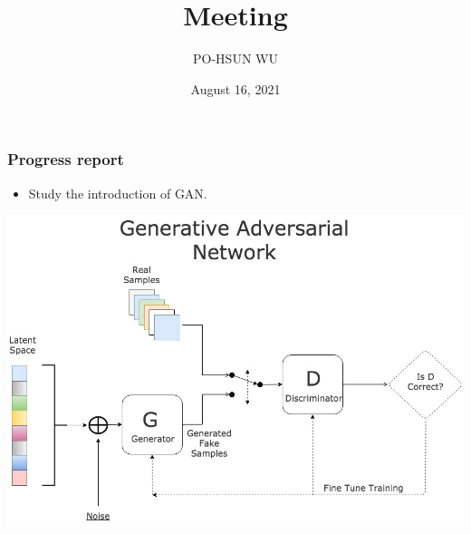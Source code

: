 \documentclass{beamer}
\date{August 16, 2021}
\title{Meeting}
\author{PO-HSUN WU}
\begin{document}
    \frame{\titlepage}

    \begin{frame}
        \frametitle{Progress report}
        \begin{itemize}
            \item Study the introduction of GAN.
        \end{itemize}
        \centering
        \includegraphics[scale=0.25]{GAN.jpeg}
    \end{frame}
\end{document}
